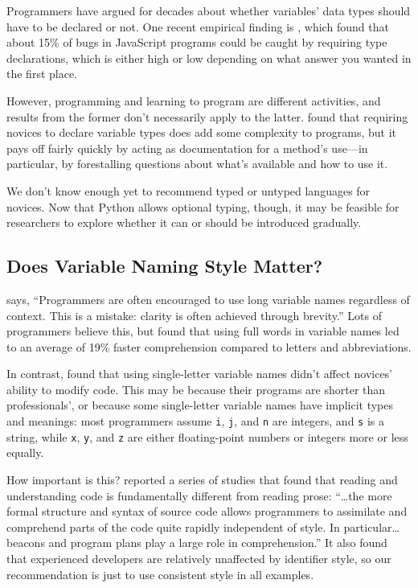 Programmers have argued for decades about whether variables' data types
should have to be declared or not. One recent empirical finding is
\cite{Gao2017}, which found that about 15\% of bugs in JavaScript
programs could be caught by requiring type declarations, which is either
high or low depending on what answer you wanted in the first place.

However, programming and learning to program are different activities,
and results from the former don't necessarily apply to the latter.
\cite{Endr2014} found that requiring novices to declare variable
types does add some complexity to programs, but it pays off fairly
quickly by acting as documentation for a method's use---in particular, by
forestalling questions about what's available and how to use it.

We don't know enough yet to recommend typed or untyped languages for
novices. Now that Python allows optional typing, though, it may be
feasible for researchers to explore whether it can or should be
introduced gradually.

\subsection{Does Variable Naming Style Matter?}\label{does-variable-naming-style-matter}

\cite{Kern1999} says, ``Programmers are often encouraged to use long
variable names regardless of context. This is a mistake: clarity is
often achieved through brevity.'' Lots of programmers believe this, but
\cite{Hofm2017} found that using full words in variable names led to
an average of 19\% faster comprehension compared to letters and
abbreviations.

In contrast, \cite{Beni2017} found that using single-letter variable
names didn't affect novices' ability to modify code. This may be because
their programs are shorter than professionals', or because some
single-letter variable names have implicit types and meanings: most
programmers assume \texttt{i}, \texttt{j}, and \texttt{n} are integers, and \texttt{s} is a string,
while \texttt{x}, \texttt{y}, and \texttt{z} are either floating-point numbers or integers
more or less equally.

How important is this? \cite{Bink2012} reported a series of studies
that found that reading and understanding code is fundamentally
different from reading prose: ``\ldots{}the more formal structure
and syntax of source code allows programmers to assimilate and
comprehend parts of the code quite rapidly independent of style. In
particular\ldots{}beacons and program plans play a large role in
comprehension.'' It also found that experienced developers are relatively
unaffected by identifier style, so our recommendation is just to use
consistent style in all examples.

